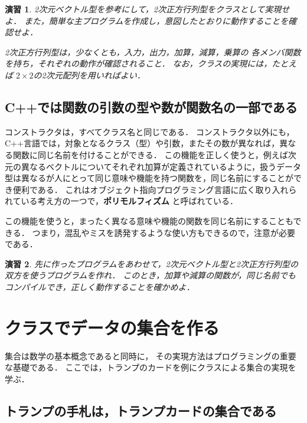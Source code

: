 \documentclass[11pt,a4,epsf]{jarticle}
\newtheorem{exerc}{演習}
\begin{document}
\begin{exerc} %
2次元ベクトル型を参考にして，2次正方行列型をクラスとして実現せよ．
また，簡単な主プログラムを作成し，意図したとおりに動作することを確認せよ．

2次正方行列型は，少なくとも，入力，出力，加算，減算，乗算の
各メンバ関数を持ち，それぞれの動作が確認されること．
なお，クラスの実現には，たとえば $2 \times 2$の2次元配列を用いればよい．

\end{exerc} %


\subsection{C++では関数の引数の型や数が関数名の一部である}

コンストラクタは，すべてクラス名と同じである．
コンストラクタ以外にも，C++言語では，対象となるクラス（型）や引数，またその数が異なれば，異なる関数に同じ名前を付けることができる．
この機能を正しく使うと，例えば次元の異なるベクトルについてそれぞれ加算が定義されているように，扱うデータ型は異なるが人にとって同じ意味や機能を持つ関数を，同じ名前にすることができ便利である．
これはオブジェクト指向プログラミング言語に広く取り入れられている考え方の一つで，{\bf ポリモルフィズム} と呼ばれている．

この機能を使うと，まったく異なる意味や機能の関数を同じ名前にすることもできる．
つまり，混乱やミスを誘発するような使い方もできるので，注意が必要である．

\begin{exerc} %
先に作ったプログラムをあわせて，2次元ベクトル型と2次正方行列型の双方を使うプログラムを作れ．
このとき，加算や減算の関数が，同じ名前でもコンパイルでき，正しく動作することを確かめよ．
\end{exerc} %


\section{クラスでデータの集合を作る}

集合は数学の基本概念であると同時に，
その実現方法はプログラミングの重要な基礎である．
ここでは，トランプのカードを例にクラスによる集合の実現を学ぶ．

\subsection{トランプの手札は，トランプカードの集合である}
\end{document}
